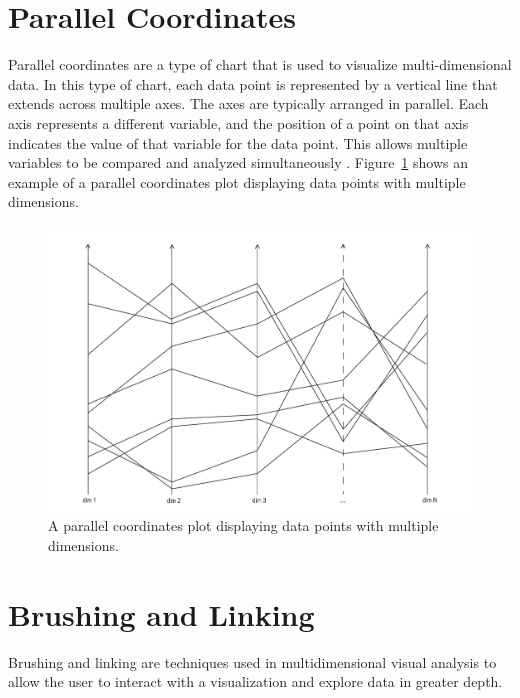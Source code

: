\section{Parallel Coordinates}

Parallel coordinates are a type of chart that is used to visualize
multi-dimensional data. In this type of chart, each data point is
represented by a vertical line that extends across multiple axes. The axes
are typically arranged in parallel. Each axis represents a different
variable, and the position of a point on that axis indicates the value of
that variable for the data point. This allows multiple variables to be
compared and analyzed simultaneously \parencite{inselberg1990parallel}.
Figure~\ref{fig:ParallelCoordinatesDiagram} shows an example of a parallel
coordinates plot displaying data points with multiple dimensions.

\begin{figure}[tp]
\centering
\includegraphics[frame,keepaspectratio,width=\linewidth,height=\halfh]
{diagrams/parallel-coordinates.pdf}

\caption[Parallel Coordinates]
{
A parallel coordinates plot displaying data points with multiple dimensions.
}
\label{fig:ParallelCoordinatesDiagram}
\end{figure}






\section{Brushing and Linking}

Brushing and linking are techniques used in multidimensional visual
analysis to allow the user to interact with a visualization and
explore data in greater depth.


